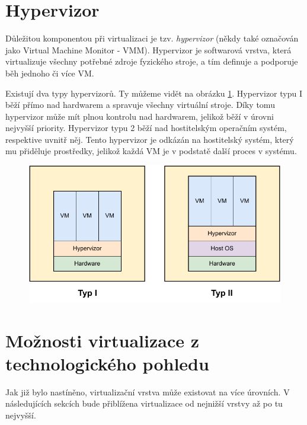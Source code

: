\section{Hypervizor}

Důležitou komponentou při virtualizaci je tzv. \textit{hypervizor} (někdy také označován jako Virtual Machine Monitor - VMM). Hypervizor je softwarová vrstva, která virtualizuje všechny potřebné zdroje fyzického stroje, a tím definuje a podporuje běh jednoho či více VM.\,\cite{whitaker2002denali}

Existují dva typy hypervizorů. Ty můžeme vidět na obrázku \ref{fig:vm_types}. Hypervizor typu I běží přímo nad hardwarem a spravuje všechny virtuální stroje. Díky tomu hypervizor může mít plnou kontrolu nad hardwarem, jelikož běží v úrovni nejvyšší priority. Hypervizor typu 2 běží nad hostitelským operačním systém, respektive uvnitř něj. Tento hypervizor je odkázán na hostitelský systém, který mu přiděluje prostředky, jelikož každá VM je v podstatě další proces v systému.\,\cite{chiueh2005survey}\cite{RODRIGUEZHARO2012267}

\begin{figure}[htbp]
    \centering 
    \includegraphics[width=\textwidth]{assets/img/vm_types.pdf}
    \label{fig:vm_types}
\end{figure}

\section{Možnosti virtualizace z technologického pohledu}

Jak již bylo nastíněno, virtualizační vrstva může existovat na více úrovních. V následujících sekcích bude přiblížena virtualizace od nejnižší vrstvy až po tu nejvyšší.


